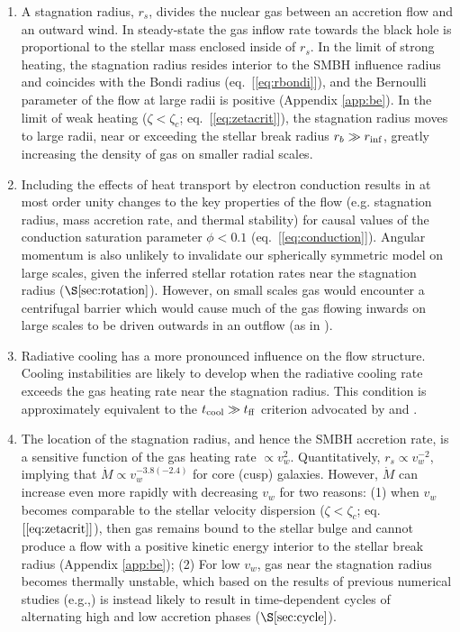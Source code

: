 \documentclass[usenatbib,fleqn]{mn2e}
\newcommand{\Mdot}{\dot{M}}
\newcommand{\rs}{r_s}
\begin{document}
  \begin{enumerate}
  \item A stagnation radius, $\rs$, divides the nuclear gas between an
    accretion flow and an outward wind. In steady-state the gas inflow
    rate towards the black hole is proportional to the stellar mass
    enclosed inside of $\rs$.  In the limit of strong heating, the
    stagnation radius resides interior to the SMBH influence radius
    and coincides with the Bondi radius (eq.~[\ref{eq:rbondi}]), and
    the Bernoulli parameter of the flow at large radii is positive
    (Appendix \ref{app:be}).  In the limit of weak heating ($\zeta <
    \zeta_c$; eq.~[\ref{eq:zetacrit}]), the stagnation radius moves to
    large radii, near or exceeding the stellar break radius $r_b \gg
    r_{\rm inf}$, greatly increasing the density of gas on smaller
    radial scales.

  \item Including the effects of heat transport by electron conduction
    results in at most order unity changes to the key properties of
    the flow (e.g. stagnation radius, mass accretion rate, and thermal
    stability) for causal values of the conduction saturation
    parameter $\phi < 0.1$ (eq.~[\ref{eq:conduction}]).  Angular
    momentum is also unlikely to invalidate our spherically symmetric
    model on large scales, given the inferred stellar rotation rates
    near the stagnation radius ($\S\ref{sec:rotation}$). However, on
    small scales gas would encounter a centrifugal barrier which would
    cause much of the gas flowing inwards on large scales to be driven
    outwards in an outflow (as in \citealt{Li+2013}). 

\item Radiative cooling has a more pronounced influence on the flow
  structure.  Cooling instabilities are likely to develop when the
  radiative cooling rate exceeds the gas heating rate near the
  stagnation radius.  This condition is approximately equivalent to
  the $t_{\rm cool} \gg t_{\rm ff}$ criterion advocated by
  \citet{McCourt+12} and \citet{Li&Bryan14a}.

\item The location of the stagnation radius, and hence the SMBH
  accretion rate, is a sensitive function of the gas heating rate
  $\propto v_w^{2}$.  Quantitatively, $\rs\propto v_w^{-2}$, implying
  that $\Mdot\propto v_w^{-3.8 (-2.4)}$ for core (cusp) galaxies.
  However, $\Mdot$ can increase even more rapidly with decreasing
  $v_w$ for two reasons: (1) when $v_w$ becomes comparable to the
  stellar velocity dispersion ($\zeta < \zeta_c$;
  eq.~$[\ref{eq:zetacrit}]$), then gas remains bound to the stellar
  bulge and cannot produce a flow with a positive kinetic energy
  interior to the stellar break radius (Appendix \ref{app:be}); (2)
  For low $v_w$, gas near the stagnation radius becomes thermally
  unstable, which based on the results of previous numerical studies
  (e.g.,\citealt{Ciotti+10}) is instead likely to result in
  time-dependent cycles of alternating high and low accretion phases
  ($\S\ref{sec:cycle}$).


\end{enumerate}
\end{document}
